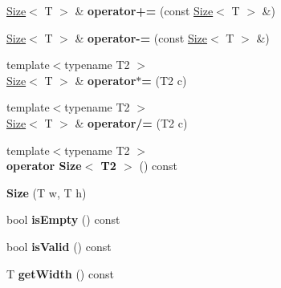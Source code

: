 \begin{DoxyCompactItemize}
\item 
\hypertarget{class_size_a0ce6047fd3c0a883acd287b5b34d083b}{
\hyperlink{class_size}{Size}$<$ T $>$ \& {\bfseries operator+=} (const \hyperlink{class_size}{Size}$<$ T $>$ \&)}
\label{class_size_a0ce6047fd3c0a883acd287b5b34d083b}

\item 
\hypertarget{class_size_a9f6d6f2e34d1d3ff3c288bb25e08ad8f}{
\hyperlink{class_size}{Size}$<$ T $>$ \& {\bfseries operator-\/=} (const \hyperlink{class_size}{Size}$<$ T $>$ \&)}
\label{class_size_a9f6d6f2e34d1d3ff3c288bb25e08ad8f}

\item 
\hypertarget{class_size_aab38c063fa04e4f22cfccab0f6417433}{
{\footnotesize template$<$typename T2 $>$ }\\\hyperlink{class_size}{Size}$<$ T $>$ \& {\bfseries operator$\ast$=} (T2 c)}
\label{class_size_aab38c063fa04e4f22cfccab0f6417433}

\item 
\hypertarget{class_size_ae23ef0c1e3fc6bd7054d6553fb6e8a00}{
{\footnotesize template$<$typename T2 $>$ }\\\hyperlink{class_size}{Size}$<$ T $>$ \& {\bfseries operator/=} (T2 c)}
\label{class_size_ae23ef0c1e3fc6bd7054d6553fb6e8a00}

\item 
\hypertarget{class_size_ae7c404e21e544f5e95a194a03c84f251}{
{\footnotesize template$<$typename T2 $>$ }\\{\bfseries operator Size$<$ T2 $>$} () const }
\label{class_size_ae7c404e21e544f5e95a194a03c84f251}

\item 
\hypertarget{class_size_af1c5ad71aa40371fa62aa71ee81c3dde}{
{\bfseries Size} (T w, T h)}
\label{class_size_af1c5ad71aa40371fa62aa71ee81c3dde}

\item 
\hypertarget{class_size_a2feb6af7868053ec23b4eea7f2cc64dd}{
bool {\bfseries isEmpty} () const }
\label{class_size_a2feb6af7868053ec23b4eea7f2cc64dd}

\item 
\hypertarget{class_size_a72f90a2c7648b173a81d1535c45e1168}{
bool {\bfseries isValid} () const }
\label{class_size_a72f90a2c7648b173a81d1535c45e1168}

\item 
\hypertarget{class_size_a8f02c9a3825f72db52762c8c6dbac9f9}{
T {\bfseries getWidth} () const }
\label{class_size_a8f02c9a3825f72db52762c8c6dbac9f9}


\end{DoxyCompactItemize}
